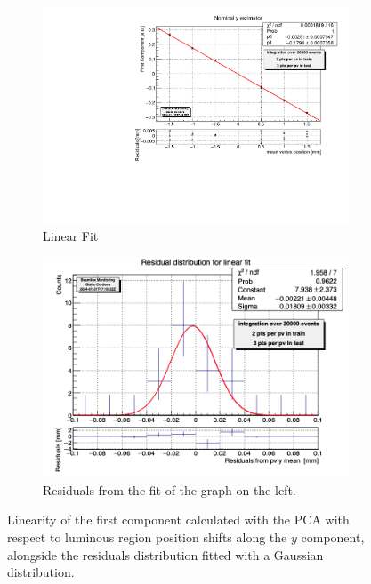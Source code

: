\begin{figure}
    \centering
    \begin{subfigure}{0.48\textwidth}
    \includegraphics[width=\linewidth]{figures/y_fit_MC.pdf}
    \caption{Linear Fit}\label{fig:yfit_MC}
    \end{subfigure}
    \begin{subfigure}{0.48\textwidth}
    \includegraphics[width=\linewidth]{figures/y_res_MC.png}
    \caption{Residuals from the fit of the graph on the left. }\label{fig:yres_MC}
    \end{subfigure}
    \caption{Linearity of the first component calculated with the PCA with respect to luminous region position shifts along the $y$ component, alongside the residuals distribution fitted with a Gaussian distribution.}
    \label{fig:y_MC}
\end{figure}%
